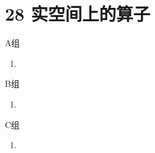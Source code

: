 \section*{28 实空间上的算子}

\vspace{2ex}

\centerline{\heiti A组}
\begin{enumerate}
    \item
\end{enumerate}

\centerline{\heiti B组}
\begin{enumerate}
    \item
\end{enumerate}

\centerline{\heiti C组}
\begin{enumerate}
    \item
\end{enumerate}

\clearpage
